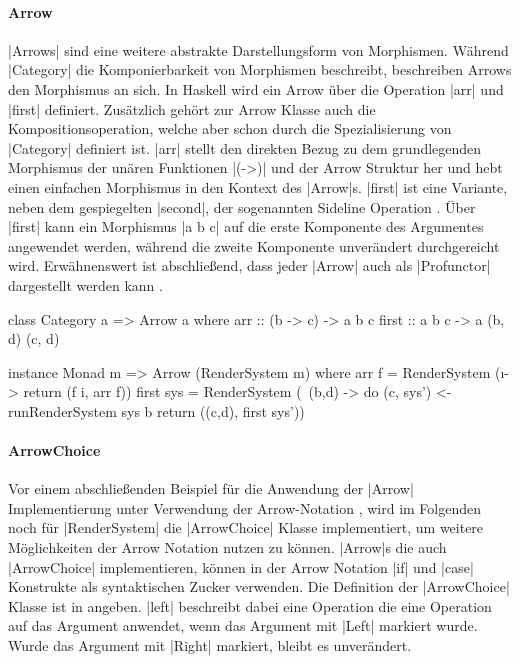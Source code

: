 
\paragraph{Arrow}

|Arrows| sind eine weitere abstrakte Darstellungsform von Morphismen. Während |Category| die Komponierbarkeit von Morphismen beschreibt, beschreiben Arrows den Morphismus an sich. In Haskell wird ein Arrow über die Operation |arr| und |first| definiert. Zusätzlich gehört zur Arrow Klasse auch die Kompositionsoperation, welche aber schon durch die Spezialisierung von |Category| definiert ist. |arr| stellt den direkten Bezug zu dem grundlegenden Morphismus der unären Funktionen |(->)| und der Arrow Struktur her und hebt einen einfachen Morphismus in den Kontext des |Arrow|s. |first| ist eine Variante, neben dem gespiegelten |second|, der sogenannten Sideline Operation \parencite[Kapitel 1]{Asada2010}. Über |first| kann ein Morphismus |a b c| auf die erste Komponente des Argumentes angewendet werden, während die zweite Komponente unverändert durchgereicht wird. Erwähnenswert ist abschließend, dass jeder |Arrow| auch als |Profunctor| dargestellt werden kann \parencite[Kapitel 3]{Asada2010}.

\begin{haskell}[label={lst:class-arrow},caption={Arrow Klasse\protect\footnotemark},nolol]
class Category a => Arrow a where
  arr :: (b -> c) -> a b c
  first :: a b c -> a (b, d) (c, d)
\end{haskell}


\begin{haskell}[label={lst:rendersystem-arrow},caption={Arrow Instanz für RenderSystem}]
instance Monad m => Arrow (RenderSystem m) where
  arr f = RenderSystem (\i -> return (f i, arr f))
  first sys = RenderSystem (\ (b,d) -> do
    (c, sys') <- runRenderSystem sys b
    return ((c,d), first sys'))
\end{haskell}


\paragraph{ArrowChoice}

Vor einem abschließenden Beispiel für die Anwendung der |Arrow| Implementierung unter Verwendung der Arrow-Notation \footnotemark, wird im Folgenden noch für |RenderSystem| die |ArrowChoice| Klasse implementiert, um weitere Möglichkeiten der Arrow Notation nutzen zu können. |Arrow|s die auch |ArrowChoice| implementieren, können in der Arrow Notation |if| und |case| Konstrukte als syntaktischen Zucker verwenden. Die Definition der |ArrowChoice| Klasse ist in  angeben. |left| beschreibt dabei eine Operation die eine Operation auf das Argument anwendet, wenn das Argument mit |Left| markiert wurde. Wurde das Argument mit |Right| markiert, bleibt es unverändert.

